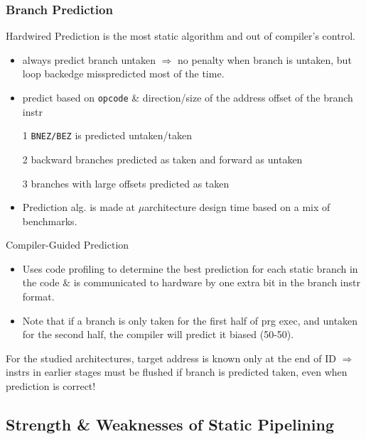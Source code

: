 \documentclass{beamer}
\newcommand{\emp}[1]{\textcolor{DikuRed}{ #1}}
\begin{document}
\begin{frame}[fragile,t]
\frametitle{Branch Prediction}

\emp{Hardwired Prediction} is the most static algorithm and out of compiler's control.
\begin{scriptsize}
\begin{itemize}
\item always predict branch untaken $\Rightarrow$ no penalty when branch is untaken,
        but loop backedge misspredicted most of the time.\smallskip
\item predict based on {\tt opcode} \& direction/size of the address offset of the 
        branch instr
\item[1] {\tt BNEZ/BEZ} is predicted untaken/taken
\item[2] backward branches predicted as taken and forward as untaken
\item[3] branches with large offsets predicted as taken 
\item \emp{Prediction alg. is made at $\mu$architecture design time based on 
            a mix of benchmarks}.
\end{itemize}
\end{scriptsize}

\bigskip

\emp{Compiler-Guided Prediction}
\begin{scriptsize}
\begin{itemize}
\item Uses code profiling to determine the best prediction
        for each static branch in the code \& is communicated to hardware 
        by one extra bit in the branch instr format.
\item Note that if a branch is only taken for the first half of prg exec,
        and untaken for the second half, the compiler will predict it biased (50-50). 
\end{itemize}
\end{scriptsize}

\bigskip

For the studied architectures, target address is known only at the end of ID $\Rightarrow$
instrs in earlier stages must be flushed if branch is predicted taken, even when 
prediction is correct!

\end{frame}

\subsection{Strength \& Weaknesses of Static Pipelining}
\end{document}
